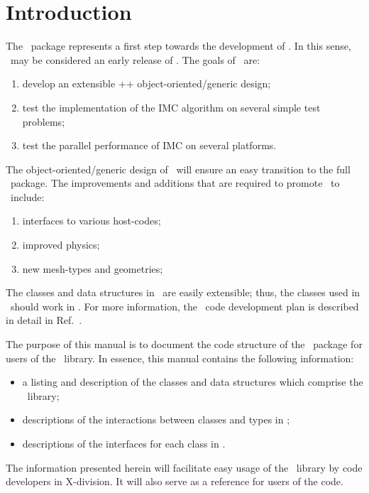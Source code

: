 
\section{Introduction}

The \imctest\ package represents a first step towards the development
of \milagro.  In this sense, \imctest\ may be considered an early
release of \milagro.  The goals of \imctest\ are:
\begin{enumerate}
\item develop an extensible \C++ object-oriented/generic design;
\item test the implementation of the IMC algorithm on several simple
  test problems;
\item test the parallel performance of IMC on several platforms.
\end{enumerate}
The object-oriented/generic design of \imctest\ will ensure an easy
transition to the full \milagro\ package.  The improvements and
additions that are required to promote \imctest\ to \milagro\ include:
\begin{enumerate}
\item interfaces to various host-codes;
\item improved physics;
\item new mesh-types and geometries;
\end{enumerate}
The classes and data structures in \imctest\ are easily extensible;
thus, the classes used in \imctest\ should work in \milagro. For more
information, the \jayenne\ code development plan is described in
detail in Ref.~.

The purpose of this manual is to document the code structure of the
\imctest\ package for users of the \imctest\ library.  In essence, this
manual contains the following information:
\begin{itemize}
\item a listing and description of the classes and data structures
  which comprise the \imctest\ library;
\item descriptions of the interactions between classes and types in
  \imctest;
\item descriptions of the interfaces for each class in \imctest.
\end{itemize}
The information presented herein will facilitate easy usage of the
\imctest\ library by code developers in X-division.  It will also serve
as a reference for users of the code.

